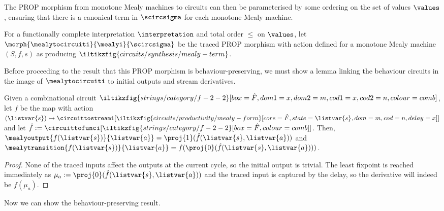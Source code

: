 The PROP morphism from monotone Mealy machines to circuits can then be
parameterised by some ordering on the set of values \(\values\), ensuring that
there is a canonical term in \(\scircsigma\) for each monotone Mealy machine.

\begin{definition}\label{def:mealy-to-circuit}
    For a functionally complete interpretation \(\interpretation\) and total
    order \(\leq\) on \(\values\), let \(
        \morph{
            \mealytocircuiti
        }{
            \mealyi
        }{
            \scircsigma
        }
    \) be the traced PROP morphism with action defined for a monotone Mealy
    machine \((S,f,s)\) as producing \(
        \iltikzfig{circuits/synthesis/mealy-term}
    \).
\end{definition}

Before proceeding to the result that this PROP morphism is behaviour-preserving,
we must show a lemma linking the behaviour circuits in the image of
\(\mealytocircuiti\) to initial outputs and stream derivatives.

\begin{proposition}
    \label{prop:mealy-form-image}
    Given a combinational circuit \(
        \iltikzfig{strings/category/f-2-2}[box=\hat{F},dom1=x,dom2=m,cod1=x,cod2=n,colour=comb]
    \), let \(f\) be the map with action \(
        (\listvar{s}) \mapsto
            \circuittostreami[
                \iltikzfig{circuits/productivity/mealy-form}[core=\hat{F},state=\listvar{s},dom=m,cod=n,delay=x]
            ]
    \) and let \(
        \hat{f}
        :=
        \circuittofunci[
            \iltikzfig{strings/category/f-2-2}[box=\hat{F},colour=comb]
        ]
    \).
    Then, \(
        \mealyoutput{f(\listvar{s})}{\listvar{a}}
        =
        \proj{1}(\hat{f}(\listvar{s}, \listvar{a}))
    \) and \(
        \mealytransition{f(\listvar{s})}{\listvar{a}}
        =
        f(\proj{0}(\hat{f}(\listvar{s}, \listvar{a})))
    \).
\end{proposition}
\begin{proof}
    None of the traced inputs affect the outputs at the
    current cycle, so the initial output is trivial.
    The least fixpoint is reached immediately as \(
        \mu_a := \proj{0}(\hat{f}(\listvar{s}, \listvar{a}))
    \) and the traced input is captured by the delay, so the derivative
    will indeed be \(f(\mu_a)\).
\end{proof}

Now we can show the behaviour-preserving result.

